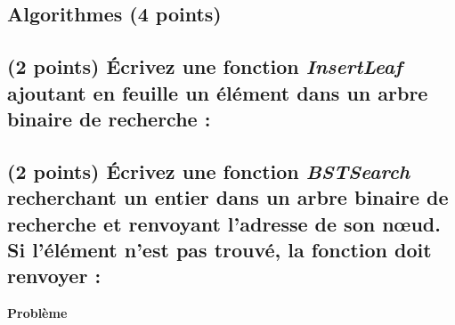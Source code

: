 \documentclass[11pt,a4paper]{article}
\begin{document}
\begin{center}
\begin{table}[ht!]
\begin{minipage}{0.50\textwidth}
   \end{minipage}
\end{table}

\end{center}

\clearpage


\subsection*{Algorithmes (4 points) }

\subsection{(2 points) \'Ecrivez une fonction \textit{InsertLeaf} ajoutant en feuille un élément dans un arbre binaire de recherche : }

\begin{center}
\end{center}


\subsection{(2 points) \'Ecrivez une fonction \textit{BSTSearch} recherchant un entier dans un arbre binaire de recherche et renvoyant l'adresse de son nœud. Si l'élément n'est pas trouvé, la fonction doit renvoyer  : }

\begin{center}
\end{center}


\clearpage


\vfillFirst

\begin{center}
{\LARGE \textbf{Problème} }
\end{center}

\vfillLast

\clearpage


\vfillFirst
\end{document}
